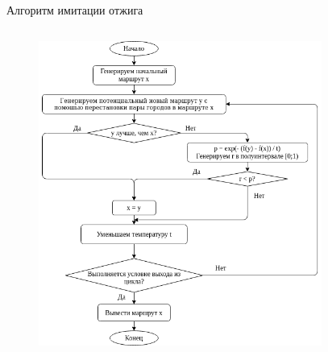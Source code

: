\documentclass[ignoreonframetext,unicode]{beamer}
\begin{document}
\begin{frame}{Алгоритм имитации отжига} 
\begin{columns}
	\begin{column}{0.7\textwidth}
	\begin{figure}[!h]
	\begin{center}
		\includegraphics[scale=0.35]{Untitled_Diagram}
	\end{center}
	\end{figure}	
	\end{column}
	\begin{column}{0.5\textwidth}
		\begin{figure}[!h]
			\begin{center}

\end{center}
\end{figure}
\end{column}
\end{columns}
\end{frame}
\end{document}

